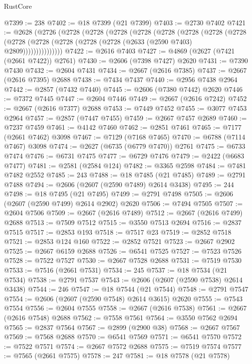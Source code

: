 \begin{lexlean}{RustCore}
\begin{coremodule}
@7399 := 238
@7402 := @18 @7399 (@21 @7399)
@7403 := @2730 @7402
@7421 := @2628
    (@2726
      (@2728
        (@2728
          (@2728
            (@2728
              (@2728
                (@2728
                  (@2728
                    (@2728
                      (@2728 (@2728 (@2728 (@2728 (@2728 (@2633 (@2590 @7403) @2809)))))))))))))))
@7422 := @2616 @7403
@7427 := @4869 (@2627 (@7421 (@2661 @7422)) @2761)
@7430 := @2606 (@7398 @7427) @2620
@7431 := @7390 @7430
@7432 := @2604 @7431
@7434 := @2667 (@2616 @7385)
@7437 := @2667 (@2616 @7395) @2688
@7438 := @7434 @7437
@7440 := @2956 @7438 @2964
@7442 := @2857 (@7432 @7440)
@7445 := @2606 (@7380 @7442) @2620
@7446 := @7372 @7445
@7447 := @2604 @7446
@7449 := @2667 (@2616 @7242)
@7452 := @2667 (@2616 @7377) @2688
@7453 := @7449 @7452
@7455 := @3077 @7453 @2964
@7457 := @2857 (@7447 @7455)
@7459 := @2667 @7457 @2689
@7460 := @7237 @7459
@7461 := @4142 @7460
@7462 := @2851 @7461
@7465 := @7177 (@2661 @7462) @3098
@7467 := @7129 (@7168 @7465)
@7470 := @6788 (@7114 @7467) @3098
@7474 := @2627 (@6735 (@6779 @7470)) @2761
@7475 := @6733 @7474
@7476 := @6731 @7475
@7477 := @6729 @7476
@7479 := @2422 (@6683 @7477)
@7481 := @2581 (@2584 @124)
@7482 := @3365 @2598
@7484 := @7481 @7482 @2552
@7485 := 243
@7488 := @18 @7485 (@21 @7485)
@7489 := @2791 @7488
@7494 := @2606 (@2607 (@2590 @7489) @2614 @3438)
@7495 := 244
@7498 := @18 @7495 (@21 @7495)
@7499 := @2791 @7498
@7505 := @2606 (@2607 (@2590 @7499) @2614 @2902) @2620
@7506 := @7494 @7505
@7507 := @2604 @7506
@7509 := @2667 (@2616 @7489)
@7512 := @2667 (@2616 @7499) @2688
@7513 := @7509 @7512
@7515 := @3550 @7513 @2694
@7516 := @2837 @7515
@7517 := @2853 @193
@7518 := @7517 @23
@7519 := @2852 @7518
@7521 := @2853 @124 @160
@7522 := @2852 @7521
@7523 := @2667 @2902
@7525 := @2667 @6159 @2688
@7526 := @6541 @7525
@7527 := @7523 @7526
@7528 := @7522 @7527
@7530 := @2667 @7528 @2688
@7531 := @7519 @7530
@7533 := @7516 (@2661 @7531)
@7534 := 245
@7537 := @18 @7534 (@21 @7534)
@7538 := @2791 @7537
@7543 := @2606 (@2607 (@2590 @7538) @2614 @3438)
@7544 := 246
@7547 := @18 @7544 (@21 @7544)
@7548 := @2791 @7547
@7554 := @2606 (@2607 (@2590 @7548) @2614 @3615) @2620
@7555 := @7543 @7554
@7556 := @2604 @7555
@7558 := @2667 (@2616 @7538)
@7561 := @2667 (@2616 @7548) @2688
@7562 := @7558 @7561
@7564 := @3550 @7562 @2694
@7565 := @2837 @7564
@7567 := @2899 (@2900 @38)
@7568 := @2667 @7567
@7569 := @7568 @2688
@7570 := @6541 @7569
@7571 := @6541 @7570
@7572 := @7522 @7571
@7574 := @2667 @7572 @2688
@7575 := @7519 @7574
@7577 := @7565 (@2661 @7575)
@7578 := 247
@7581 := @18 @7578 (@21 @7578)

\end{coremodule}
\end{lexlean}
